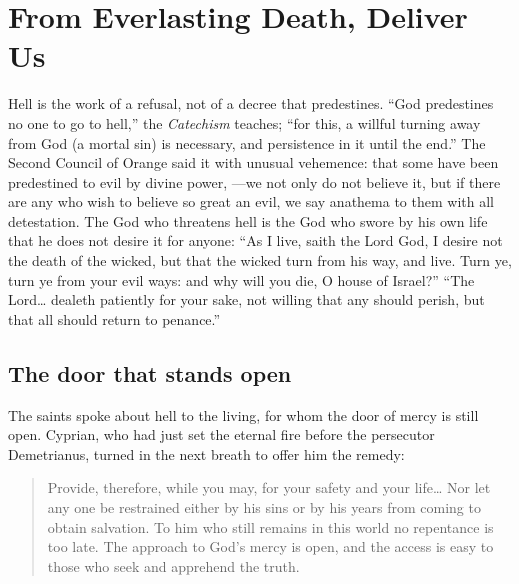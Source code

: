 \section{From Everlasting Death, Deliver Us}

Hell is the work of a refusal, not of a decree that predestines. ``God predestines no one to go to hell,'' the \emph{Catechism} teaches; ``for this, a willful turning away from God (a mortal sin) is necessary, and persistence in it until the end.'' The Second Council of Orange said it with unusual vehemence: that some have been predestined to evil by divine power, ---we not only do not believe it, but if there are any who wish to believe so great an evil, we say anathema to them with all detestation. The God who threatens hell is the God who swore by his own life that he does not desire it for anyone: ``As I live, saith the Lord God, I desire not the death of the wicked, but that the wicked turn from his way, and live. Turn ye, turn ye from your evil ways: and why will you die, O house of Israel?'' ``The Lord\ldots{} dealeth patiently for your sake, not willing that any should perish, but that all should return to penance.''

\subsection{The door that stands open}

The saints spoke about hell to the living, for whom the door of mercy is still open. Cyprian, who had just set the eternal fire before the persecutor Demetrianus, turned in the next breath to offer him the remedy:

\begin{quote}
Provide, therefore, while you may, for your safety and your life\ldots{} Nor let any one be restrained either by his sins or by his years from coming to obtain salvation. To him who still remains in this world no repentance is too late. The approach to God's mercy is open, and the access is easy to those who seek and apprehend the truth.
\end{quote}

